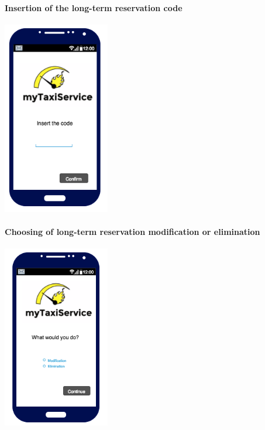 		\paragraph{Insertion of the long-term reservation code}
		\begin{center}
		    \includegraphics[width=0.35\textwidth]{./images/TELEFONO3User}
		\end{center}
		\paragraph{Choosing of long-term reservation modification or elimination}
		\begin{center}
		    \includegraphics[width=0.35\textwidth]{./images/TELEFONO4User}
		\end{center}
